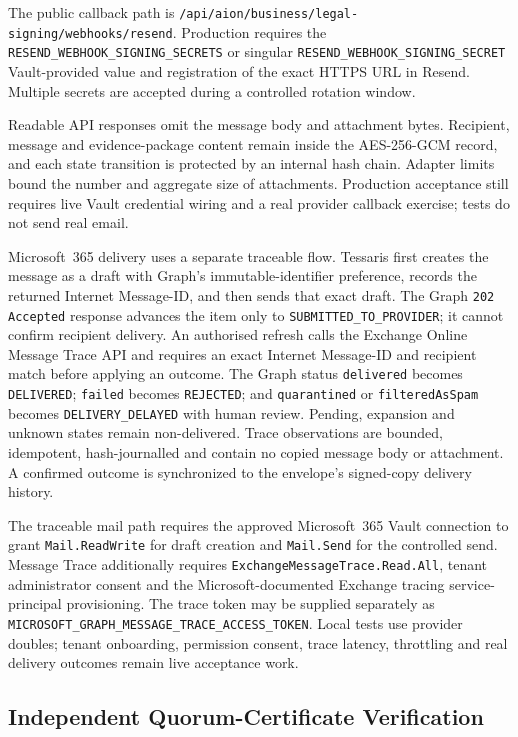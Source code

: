 The public callback path is
\texttt{/api/aion/business/legal-signing/webhooks/resend}.  Production requires
the \texttt{RESEND\_WEBHOOK\_SIGNING\_SECRETS} or singular
\texttt{RESEND\_WEBHOOK\_SIGNING\_SECRET} Vault-provided value and registration
of the exact HTTPS URL in Resend.  Multiple secrets are accepted during a
controlled rotation window.

Readable API responses omit the message body and attachment bytes.  Recipient,
message and evidence-package content remain inside the AES-256-GCM record, and
each state transition is protected by an internal hash chain.  Adapter limits
bound the number and aggregate size of attachments.  Production acceptance
still requires live Vault credential wiring and a real provider callback
exercise; tests do not send real email.

Microsoft~365 delivery uses a separate traceable flow.  Tessaris first creates
the message as a draft with Graph's immutable-identifier preference, records the
returned Internet Message-ID, and then sends that exact draft.  The Graph
\texttt{202 Accepted} response advances the item only to
\texttt{SUBMITTED\_TO\_PROVIDER}; it cannot confirm recipient delivery.  An
authorised refresh calls the Exchange Online Message Trace API and requires an
exact Internet Message-ID and recipient match before applying an outcome.  The
Graph status \texttt{delivered} becomes \texttt{DELIVERED}; \texttt{failed}
becomes \texttt{REJECTED}; and \texttt{quarantined} or
\texttt{filteredAsSpam} becomes \texttt{DELIVERY\_DELAYED} with human review.
Pending, expansion and unknown states remain non-delivered.  Trace observations
are bounded, idempotent, hash-journalled and contain no copied message body or
attachment.  A confirmed outcome is synchronized to the envelope's signed-copy
delivery history.

The traceable mail path requires the approved Microsoft~365 Vault connection to
grant \texttt{Mail.ReadWrite} for draft creation and \texttt{Mail.Send} for the
controlled send.  Message Trace additionally requires
\texttt{ExchangeMessageTrace.Read.All}, tenant administrator consent and the
Microsoft-documented Exchange tracing service-principal provisioning.  The
trace token may be supplied separately as
\texttt{MICROSOFT\_GRAPH\_MESSAGE\_TRACE\_ACCESS\_TOKEN}.  Local tests use
provider doubles; tenant onboarding, permission consent, trace latency,
throttling and real delivery outcomes remain live acceptance work.

\subsection{Independent Quorum-Certificate Verification}

